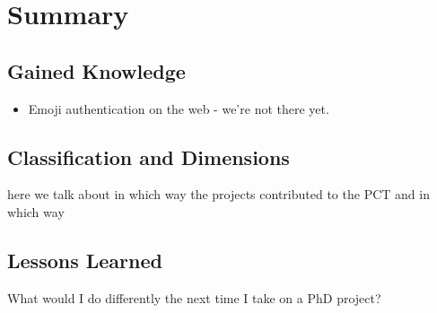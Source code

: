 \chapter[Summary]{Summary}\label{chap:summary}


\section{Gained Knowledge}
\begin{itemize}
\item Emoji authentication on the web - we're not there yet. 
\end{itemize}

\section{Classification and Dimensions}
here we talk about in which way the projects contributed to the PCT and in which way





\section{Lessons Learned}
What would I do differently the next time I take on a PhD project?



